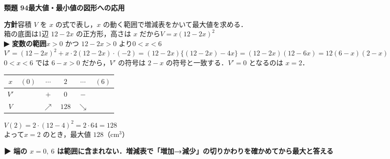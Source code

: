 \documentclass[a4paper,11pt]{ltjsarticle}
\newcommand{\ans}[2]{\Needspace{5\baselineskip}\vspace{6pt}%
  {\sffamily\bfseries 類題 #1\quad #2}\par}
\newcommand{\point}[1]{\textsf{\bfseries ▶ #1}}
\newcommand{\ax}[4]{\draw[->] (#1,0)--(#2,0) node[right]{\scriptsize $x$};
  \draw[->] (0,#3)--(0,#4) node[above]{\scriptsize $y$};
  \node[below left] at (0,0){\scriptsize O};}
\begin{document}
\ans{94}{最大値・最小値の図形への応用}
\begin{kai}
\textbf{方針}\quad 容積 $V$ を $x$ の式で表し，$x$ の動く範囲で増減表をかいて最大値を求める．\\[2pt]
箱の底面は1辺 $12-2x$ の正方形，高さは $x$ だから\quad $V=x(12-2x)^2$\\
\point{変数の範囲}\quad $x>0$ かつ $12-2x>0$ より\quad $0<x<6$\\[2pt]
$V'=(12-2x)^2+x\cdot2(12-2x)\cdot(-2)=(12-2x)\{(12-2x)-4x\}=(12-2x)(12-6x)=12(6-x)(2-x)$\\
$0<x<6$ では $6-x>0$ だから，$V'$ の符号は $2-x$ の符号と一致する．$V'=0$ となるのは $x=2$．
\begin{center}
\begin{tabular}{c|ccccc}
$x$ & $(0)$ & $\cdots$ & $2$ & $\cdots$ & $(6)$\\ \hline
$V'$ & & $+$ & $0$ & $-$ & \\ \hline
$V$ & & $\nearrow$ & $128$ & $\searrow$ &
\end{tabular}
\end{center}
$V(2)=2\cdot(12-4)^2=2\cdot64=128$\\
よって\quad $x=2$ のとき，最大値 $128$（cm$^3$）\\
\begin{center}
\end{center}
\point{端の $x=0,\ 6$ は範囲に含まれない．増減表で「増加→減少」の切りかわりを確かめてから最大と答える}
\end{kai}
\end{document}
